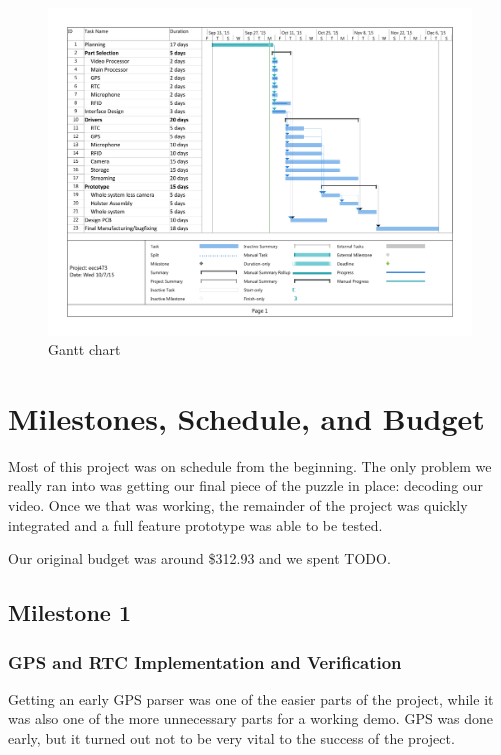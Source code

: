 \documentclass[12pt]{article}
\begin{document}
\begin{landscape}
    \thispagestyle{empty}

    \begin{figure}[h!]
        \centering
        \includegraphics[width=1.2\textwidth]{gantt}
        \caption{Gantt chart}
        \label{fig:gantt}
    \end{figure}
\end{landscape}

\section{Milestones, Schedule, and Budget}
Most of this project was on schedule from the beginning. The only problem we
really ran into was getting our final piece of the puzzle in place: decoding
our video. Once we that was working, the remainder of the project was quickly
integrated and a full feature prototype was able to be tested. 

Our original budget was around \$312.93 and we spent TODO. %

\subsection{Milestone 1}
\subsubsection{GPS and RTC Implementation and Verification}
Getting an early GPS parser was one of the easier parts of the project, while
it was also one of the more unnecessary parts for a working demo. GPS was done
early, but it turned out not to be very vital to the success of the project.
\end{document}
